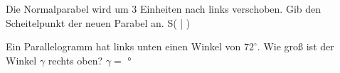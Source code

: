 \documentclass[11pt]{article}
\begin{document}
\begin{aufgabe}{\begin{minipage}[t]{0.6\linewidth}Die Normalparabel wird um $3$ Einheiten nach links verschoben. Gib den Scheitelpunkt der neuen Parabel an. S( \leerfeld | \leerfeld )\end{minipage}\hfill\begin{minipage}[t]{0.37\linewidth}\vspace{0pt}
\begin{ksys}[xmin=-5,xmax=5,ymin=-5,ymax=5,klein]  \end{ksys}
\end{minipage}}
\end{aufgabe}

\begin{aufgabe}{\begin{minipage}[t]{0.6\linewidth}Ein Parallelogramm hat links unten einen Winkel von $72^\circ$. Wie groß ist der Winkel $\gamma$ rechts oben? $\gamma =$ \leerfeld °\end{minipage}\hfill\begin{minipage}[t]{0.37\linewidth}\vspace{0pt}
\end{minipage}}
\end{aufgabe}
\end{document}
